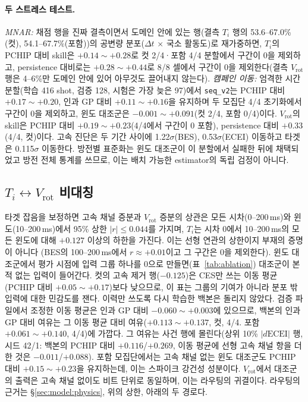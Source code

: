 \documentclass[10pt,twocolumn,letterpaper]{article}
\newcommand{\Ti}{\ensuremath{T_i}}
\newcommand{\Vrot}{\ensuremath{V_\mathrm{rot}}}
\newcommand{\seqv}{\texttt{seq\_v2}}
\begin{document}
\paragraph{두 스트레스 테스트.} \emph{MNAR:} 채점 행을 진짜 결측이면서 도메인 안에 있는
행(결측 \Ti{} 행의 53.6--67.0\%(컷), 54.1--67.7\%(포함))의 공변량 분포($\Delta t$ $\times$
국소 활동도)로 재가중하면, \Ti{}의 PCHIP 대비 skill은 $+0.14\sim+0.28$로 컷 2/4·포함 4/4
분할에서 구간이 0을 제외하고, persistence 대비로는 $+0.28\sim+0.44$로 8/8 셀에서 구간이
0을 제외한다(결측 \Vrot{} 행은 4--6\%만 도메인 안에 있어 아무것도 끌어내지 않는다).
\emph{캠페인 이동:} 엄격한 시간 분할(학습 416 shot, 검증 128, 시험은 가장 늦은 97)에서
\seqv{}는 PCHIP 대비 $+0.17\sim+0.20$, 인과 GP 대비 $+0.11\sim+0.16$을 유지하며 두 모집단
4/4 초기화에서 구간이 0을 제외하고, 윈도 대조군은 $-0.001\sim+0.091$(컷 2/4, 포함 0/4)이다.
\Vrot{}의 skill은 PCHIP 대비 $+0.19\sim+0.23$(4/4에서 구간이 0 포함), persistence 대비
$+0.33$(4/4, 컷)이다. 고속 진단은 두 기간 사이에 1.22$\sigma$(BES), 0.53$\sigma$(ECEI)
이동하고 타겟은 0.115$\sigma$ 이동한다. 방전별 표준화는 윈도 대조군이 이 분할에서 실패한
뒤에 채택되었고 방전 전체 통계를 쓰므로, 이는 배치 가능한 estimator의 독립 검정이 아니다.

\subsection{\texorpdfstring{\Ti$\leftrightarrow$\Vrot{} 비대칭}{Ti-Vrot 비대칭}}
\label{sec:res:asym}
타겟 잡음을 보정하면 고속 채널 증분과 \Vrot{} 증분의 상관은 모든 시차(0--200\,ms)와
윈도(10--200\,ms)에서 95\% 상한 $|r| \leq 0.044$를 가지며, \Ti{}는 시차 0에서 10--200\,ms의
모든 윈도에 대해 $+0.127$ 이상의 하한을 가진다. 이는 선형 연관의 상한이지 부재의 증명이 아니다
(BES의 100--200\,ms에서 $r \approx +0.01$이고 그 구간은 0을 제외한다). 윈도 대조군에서 평가
시점에 입력 그룹 하나를 0으로 만들면(표~\ref{tab:ablation}) 대조군이 본 적 없는 입력이
들어간다. 컷의 고속 제거 행($-0.125$)은 CES만 쓰는 이동 평균(PCHIP 대비 $+0.05\sim+0.17$)보다
낮으므로, 이 표는 그룹의 기여가 아니라 분포 밖 입력에 대한 민감도를 잰다. 이력만 쓰도록 다시
학습한 백본은 돌리지 않았다. 검증 파일에서 조정한 이동 평균은 인과 GP 대비 $-0.060\sim+0.003$에
있으므로, 백본의 인과 GP 대비 여유는 그 이동 평균 대비 여유($+0.113\sim+0.137$, 컷, 4/4.
포함 $+0.061\sim+0.140$, 4/4)에 가깝다. 그 여유는 사건 행에 몰린다(상위 10\%
$|d\mathrm{ECEI}|$ 행, 시드 42/1: 백본의 PCHIP 대비 $+0.116$/$+0.269$, 이동 평균에 선형 고속
채널 항을 더한 것은 $-0.011$/$+0.088$). 포함 모집단에서는 고속 채널 없는 윈도 대조군도 PCHIP 대비 $+0.15\sim+0.23$을
유지하는데, 이는 스파이크 강건성 성분이다. \Vrot{}에서 대조군의 출력은 고속 채널 없이도
비트 단위로 동일하며, 이는 라우팅의 귀결이다. 라우팅의 근거는 \S\ref{sec:model:physics}, 위의
상한, 아래의 두 경로다.
\end{document}
